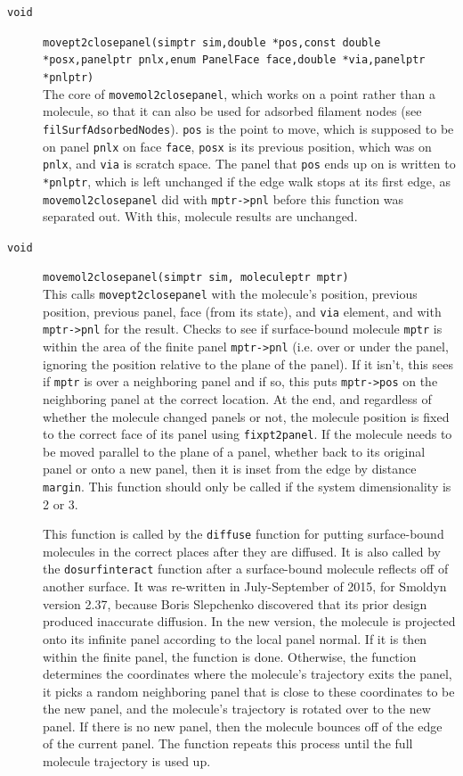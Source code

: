 \documentclass {scrbook}
\newcommand {\ttt} {\texttt}
\begin{document}
\begin{description}
\item[\ttt{void}]
\ttt{movept2closepanel(simptr sim,double *pos,const double *posx,panelptr pnlx,enum PanelFace face,double *via,panelptr *pnlptr)}
\hfill \\
The core of \ttt{movemol2closepanel}, which works on a point rather than a molecule, so that it can also be used for adsorbed filament nodes (see \ttt{filSurfAdsorbedNodes}). \ttt{pos} is the point to move, which is supposed to be on panel \ttt{pnlx} on face \ttt{face}, \ttt{posx} is its previous position, which was on \ttt{pnlx}, and \ttt{via} is scratch space. The panel that \ttt{pos} ends up on is written to \ttt{*pnlptr}, which is left unchanged if the edge walk stops at its first edge, as \ttt{movemol2closepanel} did with \ttt{mptr->pnl} before this function was separated out. With this, molecule results are unchanged.

\item[\ttt{void}]
\ttt{movemol2closepanel(simptr sim, moleculeptr mptr)}
\hfill \\
This calls \ttt{movept2closepanel} with the molecule's position, previous position, previous panel, face (from its state), and \ttt{via} element, and with \ttt{mptr->pnl} for the result. 
Checks to see if surface-bound molecule \ttt{mptr} is within the area of the finite panel \ttt{mptr->pnl} (i.e. over or under the panel, ignoring the position relative to the plane of the panel). If it isn't, this sees if \ttt{mptr} is over a neighboring panel and if so, this puts \ttt{mptr->pos} on the neighboring panel at the correct location. At the end, and regardless of whether the molecule changed panels or not, the molecule position is fixed to the correct face of its panel using \ttt{fixpt2panel}. If the molecule needs to be moved parallel to the plane of a panel, whether back to its original panel or onto a new panel, then it is inset from the edge by distance \ttt{margin}. This function should only be called if the system dimensionality is 2 or 3.

This function is called by the \ttt{diffuse} function for putting surface-bound molecules in the correct places after they are diffused. It is also called by the \ttt{dosurfinteract} function after a surface-bound molecule reflects off of another surface. It was re-written in July-September of 2015, for Smoldyn version 2.37, because Boris Slepchenko discovered that its prior design produced inaccurate diffusion. In the new version, the molecule is projected onto its infinite panel according to the local panel normal. If it is then within the finite panel, the function is done. Otherwise, the function determines the coordinates where the molecule's trajectory exits the panel, it picks a random neighboring panel that is close to these coordinates to be the new panel, and the molecule's trajectory is rotated over to the new panel. If there is no new panel, then the molecule bounces off of the edge of the current panel. The function repeats this process until the full molecule trajectory is used up.


\end{description}
\end{document}
